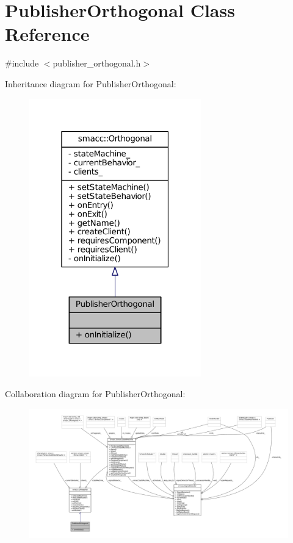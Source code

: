 \hypertarget{classPublisherOrthogonal}{}\section{Publisher\+Orthogonal Class Reference}
\label{classPublisherOrthogonal}


{\ttfamily \#include $<$publisher\+\_\+orthogonal.\+h$>$}



Inheritance diagram for Publisher\+Orthogonal\+:
\nopagebreak
\begin{figure}[H]
\begin{center}
\leavevmode
\includegraphics[width=211pt]{classPublisherOrthogonal__inherit__graph}
\end{center}
\end{figure}


Collaboration diagram for Publisher\+Orthogonal\+:
\nopagebreak
\begin{figure}[H]
\begin{center}
\leavevmode
\includegraphics[width=350pt]{classPublisherOrthogonal__coll__graph}
\end{center}
\end{figure}
